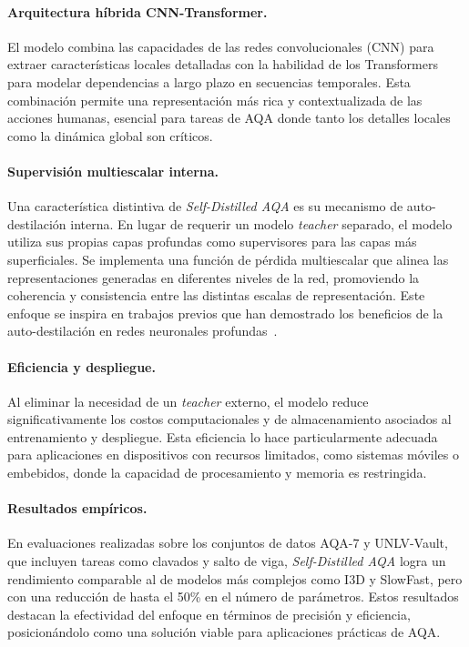\paragraph{Arquitectura híbrida CNN-Transformer.} El modelo combina las capacidades de las redes convolucionales (CNN) para extraer características locales detalladas con la habilidad de los Transformers para modelar dependencias a largo plazo en secuencias temporales. Esta combinación permite una representación más rica y contextualizada de las acciones humanas, esencial para tareas de AQA donde tanto los detalles locales como la dinámica global son críticos.

\paragraph{Supervisión multiescalar interna.} Una característica distintiva de \textit{Self-Distilled AQA} es su mecanismo de auto-destilación interna. En lugar de requerir un modelo \textit{teacher} separado, el modelo utiliza sus propias capas profundas como supervisores para las capas más superficiales. Se implementa una función de pérdida multiescalar que alinea las representaciones generadas en diferentes niveles de la red, promoviendo la coherencia y consistencia entre las distintas escalas de representación. Este enfoque se inspira en trabajos previos que han demostrado los beneficios de la auto-destilación en redes neuronales profundas~\cite{zhang2019be}.

\paragraph{Eficiencia y despliegue.} Al eliminar la necesidad de un \textit{teacher} externo, el modelo reduce significativamente los costos computacionales y de almacenamiento asociados al entrenamiento y despliegue. Esta eficiencia lo hace particularmente adecuada para aplicaciones en dispositivos con recursos limitados, como sistemas móviles o embebidos, donde la capacidad de procesamiento y memoria es restringida.

\paragraph{Resultados empíricos.} En evaluaciones realizadas sobre los conjuntos de datos AQA-7 y UNLV-Vault, que incluyen tareas como clavados y salto de viga, \textit{Self-Distilled AQA} logra un rendimiento comparable al de modelos más complejos como I3D y SlowFast, pero con una reducción de hasta el 50\% en el número de parámetros. Estos resultados destacan la efectividad del enfoque en términos de precisión y eficiencia, posicionándolo como una solución viable para aplicaciones prácticas de AQA.

